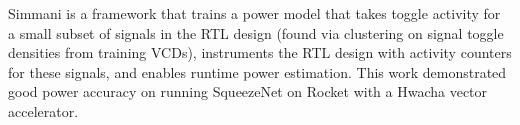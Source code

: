 \documentclass[sigconf]{acmart}
\begin{document}

Simmani\cite{simmani} is a framework that trains a power model that takes toggle activity for a small subset of signals in the RTL design (found via clustering on signal toggle densities from training VCDs), instruments the RTL design with activity counters for these signals, and enables runtime power estimation.
This work demonstrated good power accuracy on running SqueezeNet on Rocket with a Hwacha vector accelerator.




\end{document}
